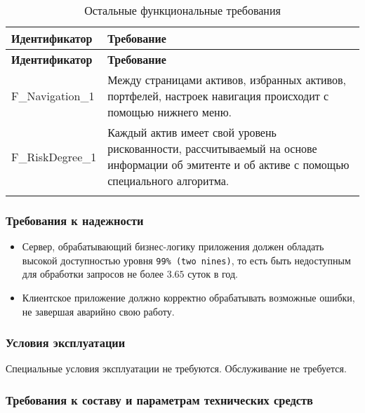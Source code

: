 \documentclass[a4paper, 14pt]{article}
\begin{document}
\begin{longtable}{| p{} | p{} |}
    \hline
    \textbf{Идентификатор}          & \textbf{Требование}                                                                                                                                                                \\
    \hline
    \endfirsthead
    \hline
    \textbf{Идентификатор}          & \textbf{Требование}                                                                                                                                                                \\
    \hline
    \endhead

    F\_Navigation\_1                & Между страницами активов, избранных активов, портфелей, настроек навигация происходит с помощью нижнего меню.                                                                 \\ \hline
    F\_RiskDegree\_1    & Каждый актив имеет свой уровень рискованности, рассчитываемый на основе информации об эмитенте и об активе с помощью специального алгоритма.                                                  \\ \hline

    \caption{Остальные функциональные требования}
\end{longtable}

\subsubsection{Требования к надежности}

\begin{itemize}
    \item Сервер, обрабатывающий бизнес-логику приложения должен обладать высокой доступностью уровня \texttt{99\% (two nines)}, то есть быть недоступным для обработки запросов не более $3.65$ суток в год.
    \item Клиентское приложение должно корректно обрабатывать возможные ошибки, не завершая аварийно свою работу.
\end{itemize}

\subsubsection{Условия эксплуатации}

Специальные условия эксплуатации не требуются.
Обслуживание не требуется.

\subsubsection{Требования к составу и параметрам технических средств}
\end{document}
